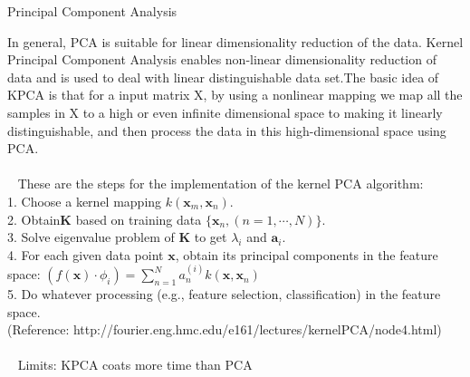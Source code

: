 \documentclass[
	ngerman,
	]{tudaexercise}
\begin{document}
\begin{task}{Principal Component Analysis}
\begin{subtask}
In general, PCA is suitable for linear dimensionality reduction of the data. Kernel Principal Component Analysis enables non-linear dimensionality reduction of data and is used to deal with linear distinguishable data set.The basic idea of KPCA is that for a  input matrix X, by using a nonlinear mapping we map all the samples in X to a high or even infinite dimensional space to making it linearly distinguishable, and then process the data in this high-dimensional space using PCA.\\
\\~
These are the steps for the implementation of the kernel PCA algorithm:\\
1. Choose a kernel mapping $k({\mathbf x}_m,{\mathbf x}_n)$.\\
2. Obtain${\mathbf K}$ based on training data $\{ {\mathbf x}_n, (n=1,\cdots,N)\}$.\\
3. Solve eigenvalue problem of ${\mathbf K}$ to get $\lambda_i$ and ${\mathbf a}_i$.\\
4. For each given data point ${\mathbf x}$, obtain its principal components in the feature space: $(f({\mathbf x})\cdot \phi_i)=\sum_{n=1}^N a_n^{(i)} k({\mathbf x}, {\mathbf x}_n) $\\
5. Do whatever processing (e.g., feature selection, classification) in the feature space.\\
(Reference: http://fourier.eng.hmc.edu/e161/lectures/kernelPCA/node4.html)\\
\\~
Limits: KPCA coats more time than PCA
\end{subtask}

\end{task}
\end{document}
